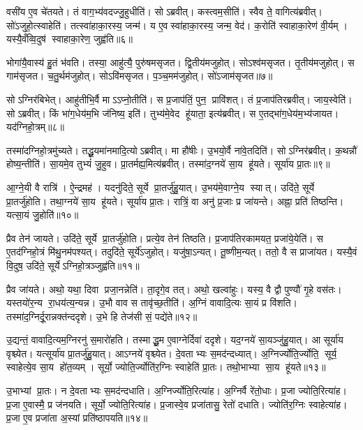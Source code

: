 वसी॑य ए॒व चे॑तयते। तं वाग॒भ्य॑वदज्जु॒हुधीति॑। सोऽब्रवीत्। कस्त्वम॒सीति॑। स्वैव ते॒ वागित्य॑ब्रवीत्। सो॑ऽजुहो॒त्स्वाहेति॑। तत्स्वा॑हाका॒रस्य॒ जन्म॑। य ए॒वस्वा॑हाका॒रस्य॒ जन्म॒ वेद॑। क॒रोति॑ स्वाहाका॒रेण॑ वी॒र्यम्। यस्यै॒वँव्वि॒दुष॑ स्वाहाका॒रेण॒ जुह्व॑ति॥६॥

भोगा॑यै॒वास्य॑ हु॒तं भ॑वति। तस्या॒ आहु॑त्यै॒ पुरु॑षमसृजत। द्वि॒तीय॑मजुहोत्। सोऽश्व॑मसृजत। तृ॒तीय॑मजुहोत्। स गाम॑सृजत। च॒तु॒र्थम॑जुहोत्। सोऽवि॑मसृजत। प॒ञ्च॒मम॑जुहोत्। सो॑ऽजाम॑सृजत॥७॥

सोऽग्निर॑बिभेत्। आहु॑तीभि॒र्वै माऽऽप्नो॒तीति॑। स प्र॒जाप॑तिं॒ पुन॒ प्रावि॑शत्। तं प्र॒जाप॑तिरब्रवीत्। जाय॒स्वेति॑। सोऽब्रवीत्। किं भा॑ग॒धेय॑म॒भि ज॑निष्य॒ इति॑। तुभ्य॑मे॒वेद हू॑याता॒ इत्य॑ब्रवीत्। स ए॒तद्भा॑ग॒धेय॑म॒भ्य॑जायत। यद॑ग्निहो॒त्रम्॥८॥

तस्मा॑दग्निहो॒त्रमु॑च्यते। तद्धू॒यमा॑नमादि॒त्योऽब्रवीत्। मा हौ॑षीः। उ॒भयो॒र्वै ना॑वे॒तदिति॑। सोऽग्निर॑ब्रवीत्। क॒थन्नौ॑ होष्य॒न्तीति॑। सा॒यमे॒व तुभ्यं॑ जु॒हुव\sn{}। प्रा॒तर्मह्य॒मित्य॑ब्रवीत्। तस्मा॑द॒ग्नये॑ सा॒य हू॑यते। सूर्या॑य प्रा॒तः॥९॥

आ॒ग्ने॒यी वै रात्रि॑। ऐ॒न्द्रमह॑। यदनु॑दिते॒ सूर्ये प्रा॒तर्जु॑हु॒यात्। उ॒भय॑मे॒वाग्ने॒य स्यात्। उदि॑ते॒ सूर्ये प्रा॒तर्जु॑होति। तथा॒ग्नये॑ सा॒य हू॑यते। सूर्या॑य प्रा॒तः। रात्रिं॒ वा अनु॑ प्र॒जाः प्र जा॑यन्ते। अह्ना॒ प्रति॑ तिष्ठन्ति। यत्सा॒यं जु॒होति॑॥१०॥

प्रैव तेन॑ जायते। उदि॑ते॒ सूर्ये प्रा॒तर्जु॑होति। प्रत्ये॒व तेन॑ तिष्ठति। प्र॒जाप॑तिरकामयत॒ प्रजा॑ये॒येति॑। स ए॒तद॑ग्निहो॒त्रं मि॑थु॒नम॑पश्यत्। तदुदि॑ते॒ सूर्ये॑ऽजुहोत्। यजु॑षा॒ऽन्यत्। तू॒ष्णीम॒न्यत्। ततो॒ वै स प्राजा॑यत। यस्यै॒वं वि॒दुष॒ उदि॑ते॒ सूर्येऽग्निहो॒त्रञ्जुह्व॑ति॥११॥

प्रैव जा॑यते। अथो॒ यथा॒ दिवा प्रजा॒नन्नेति॑। ता॒दृगे॒व तत्। अथो॒ खल्वा॑हुः। यस्य॒ वै द्वौ पुण्यौ॑ गृ॒हे वस॑तः। यस्तयो॑र॒न्य रा॒धय॑त्य॒न्यन्न। उ॒भौ वाव स तावृ॑च्छ॒तीति॑। अ॒ग्निं वावादि॒त्यः सा॒यं प्र वि॑शति। तस्मा॑द॒ग्निर्दू॒रान्नक्त॑न्ददृशे। उ॒भे हि तेज॑सी सं॒ पद्ये॑ते॥१२॥

उ॒द्यन्तं॒ वावादि॒त्यम॒ग्निरनु॑ स॒मारो॑हति। तस्माद्धू॒म ए॒वाग्नेर्दिवा॑ ददृशे। यद॒ग्नये॑ सा॒यञ्जु॑हु॒यात्। आ सूर्या॑य वृश्च्येत। यत्सूर्या॑य प्रा॒तर्जु॑हु॒यात्। आऽग्नये॑ वृश्च्येत। दे॒वताभ्यः स॒मद॑न्दध्यात्। अ॒ग्निर्ज्योति॒र्ज्योति॒ सूर्य॒ स्वाहेत्ये॒व सा॒य हो॑त॒व्यम्। सूर्यो॒ ज्योति॒र्ज्योति॑र॒ग्निः स्वाहेति॑ प्रा॒तः। तथो॒भाभ्या सा॒य हू॑यते॥१३॥

उ॒भाभ्यां प्रा॒तः। न दे॒वताभ्यः स॒मद॑न्दधाति। अ॒ग्निर्ज्योति॒रित्या॑ह। अ॒ग्निर्वै रे॑तो॒धाः। प्र॒जा ज्योति॒रित्या॑ह। प्र॒जा ए॒वास्मै॒ प्र ज॑नयति। सूर्यो॒ ज्योति॒रित्या॑ह। प्र॒जास्वे॒व प्रजा॑तासु॒ रेतो॑ दधाति। ज्योति॑र॒ग्निः स्वाहेत्या॑ह। प्र॒जा ए॒व प्रजा॑ता अ॒स्यां प्रति॑ष्ठापयति॥१४॥

